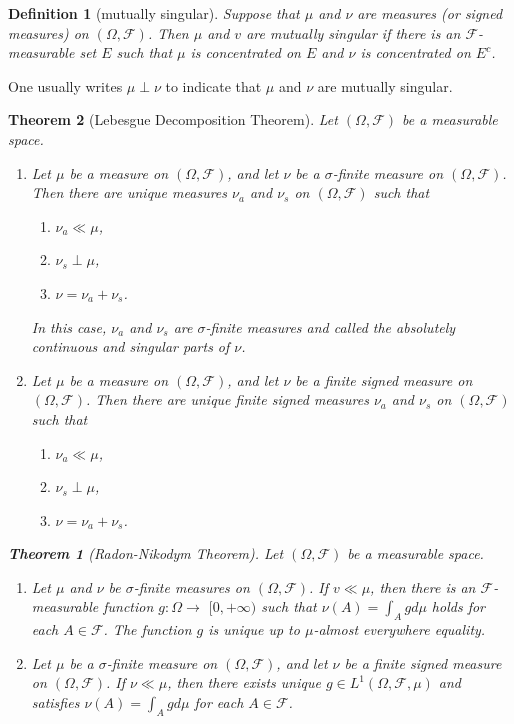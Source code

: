 \documentclass{report}
\newtheorem{definition}{Definition}[section]
\newtheorem{theorem}{Theorem}[section]
\theoremstyle{nonumberplain}
\begin{document}
\begin{definition}[mutually singular]
	Suppose that $\mu$ and $\nu$ are measures (or signed measures) on $(\Omega, \mathcal{F})$. Then $\mu$ and $v$ are \emph{mutually singular} if there is an $\mathcal{F}$-measurable set $E$ such that $\mu$ is concentrated on $E$ and $\nu$ is concentrated on $E^{c}$.
\end{definition}
One usually writes $\mu \perp \nu$ to indicate that $\mu$ and $\nu$ are mutually singular.

\begin{theorem}[Lebesgue Decomposition Theorem]
	Let $(\Omega, \mathcal{F})$ be a measurable space.
\begin{enumerate}
	\item Let $\mu$ be a measure on $(\Omega, \mathcal{F})$, and let $\nu$ be a $\sigma$-finite measure on $(\Omega, \mathcal{F})$. Then there are unique measures $\nu_{a}$ and $\nu_{s}$ on $(\Omega, \mathcal{F})$ such that
	\begin{enumerate}[label=(\alph*)]
		\item $\nu_{a}\ll\mu$,
		\item $\nu_{s}\perp\mu$,
		\item $\nu=\nu_{a}+\nu_{s}$.
	\end{enumerate}
	In this case, $\nu_a$ and $\nu_s$ are $\sigma$-finite measures and called the absolutely continuous and singular parts of $\nu$.
	\item Let $\mu$ be a measure on $(\Omega, \mathcal{F})$, and let $\nu$ be a finite signed measure on $(\Omega, \mathcal{F})$. Then there are unique finite signed measures $\nu_{a}$ and $\nu_{s}$ on $(\Omega, \mathcal{F})$ such that
	\begin{enumerate}[label=(\alph*)]
		\item $\nu_{a}\ll\mu$,
		\item $\nu_{s}\perp\mu$,
		\item $\nu=\nu_{a}+\nu_{s}$.
	\end{enumerate}
\end{enumerate}
\begin{theorem}[Radon-Nikodym Theorem]
	Let $(\Omega, \mathcal{F})$ be a measurable space.
	\begin{enumerate}
		\item Let $\mu$ and $\nu$ be $\sigma$-finite measures on $(\Omega, \mathcal{F})$. If $v\ll\mu$, then there is an $\mathcal{F}$-measurable function $g:\Omega\rightarrow$ $[0,+\infty)$ such that $\nu(A)=\int_{A} g d \mu$ holds for each $A\in\mathcal{F}$. The function $g$ is unique up to $\mu$-almost everywhere equality.
		\item Let $\mu$ be a $\sigma$-finite measure on $(\Omega, \mathcal{F})$, and let $\nu$ be a finite signed measure on $(\Omega, \mathcal{F})$. If $\nu\ll\mu$, then there exists unique $g\in L^{1}(\Omega, \mathcal{F}, \mu)$ and satisfies $\nu(A)=\int_{A} g d \mu$ for each $A\in\mathcal{F}$.
	\end{enumerate}
\end{theorem}

\end{theorem}
\end{document}
